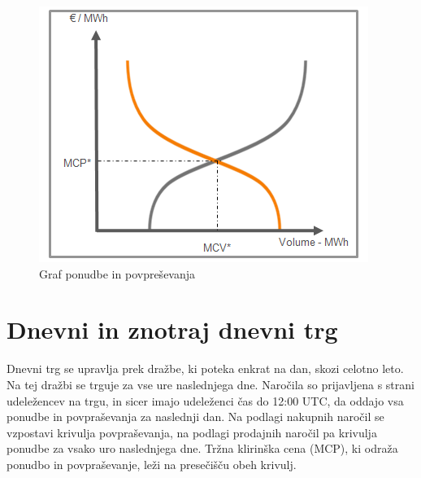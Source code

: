 \documentclass[12pt,a4paper]{amsart}
\theoremstyle{definition} %
\theoremstyle{plain} %
\begin{document}
{\begin{figure}[h]
    \centering
    \includegraphics[scale=0.75]{curve}
    \caption{Graf ponudbe in povpreševanja}
    \label{fig:postena_cena}
\end{figure}

\section*{Dnevni in znotraj dnevni trg}

Dnevni trg se upravlja prek dražbe, ki poteka enkrat na dan, skozi celotno leto. Na tej dražbi se trguje za vse ure naslednjega dne. Naročila so prijavljena s strani udeležencev na trgu, 
in sicer imajo udeleženci čas do 12:00 UTC, da oddajo vsa ponudbe in povpraševanja za naslednji dan. Na podlagi nakupnih naročil se vzpostavi krivulja povpraševanja, na podlagi prodajnih naročil pa krivulja ponudbe za vsako uro naslednjega dne. Tržna klirinška cena (MCP), ki odraža ponudbo in povpraševanje, leži na presečišču obeh krivulj.


}
\end{document}
